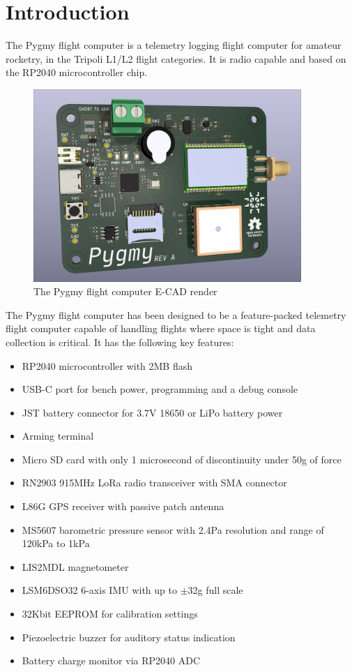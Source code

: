 \section{Introduction}

The Pygmy flight computer is a telemetry logging flight computer for amateur rocketry, in the Tripoli L1/L2 flight
categories. It is radio capable and based on the RP2040 microcontroller chip.

\begin{figure}[H]
    \centering
    \includegraphics[width=4in]{../assets/pygmy.png}
    \caption{The Pygmy flight computer E-CAD render}
\end{figure}

The Pygmy flight computer has been designed to be a feature-packed telemetry flight computer capable of handling
flights where space is tight and data collection is critical. It has the following key features:

\begin{itemize}
    \item RP2040 microcontroller with 2MB flash
    \item USB-C port for bench power, programming and a debug console
    \item JST battery connector for 3.7V 18650 or LiPo battery power
    \item Arming terminal
    \item Micro SD card with only 1 microsecond of discontinuity under 50g of force
    \item RN2903 915MHz LoRa radio transceiver with SMA connector
    \item L86G GPS receiver with passive patch antenna
    \item MS5607 barometric pressure sensor with 2.4Pa resolution and range of 120kPa to 1kPa
    \item LIS2MDL magnetometer
    \item LSM6DSO32 6-axis IMU with up to $\pm$32g full scale
    \item 32Kbit EEPROM for calibration settings
    \item Piezoelectric buzzer for auditory status indication
    \item Battery charge monitor via RP2040 ADC
\end{itemize}
